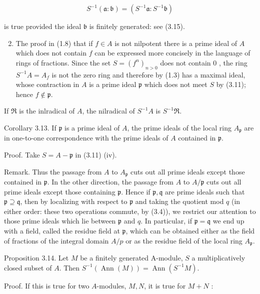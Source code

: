 \documentclass{standalone}
\theoremstyle{definition}
\theoremstyle{remark}
\begin{document}
\[
S^{-1}(\mathfrak{a}: \mathfrak{b})=\left(S^{-1} \mathfrak{a}: S^{-1} \mathfrak{b}\right)
\]

is true provided the ideal $\mathfrak{b}$ is finitely generated: see (3.15).

\begin{enumerate}
  \setcounter{enumi}{1}
  \item The proof in (1.8) that if $f \in A$ is not nilpotent there is a prime ideal of $A$ which does not contain $f$ can be expressed more concisely in the language of rings of fractions. Since the set $S=\left(f^{n}\right)_{n>0}$ does not contain 0 , the ring $S^{-1} A=A_{f}$ is not the zero ring and therefore by (1.3) has a maximal ideal, whose contraction in $A$ is a prime ideal $\mathfrak{p}$ which does not meet $S$ by (3.11); hence $f \notin \mathfrak{p}$.
\end{enumerate}
\begin{corollary}
If $\Re$ is the inlradical of $A$, the nilradical of $S^{-1}A$ is $S^{-1}\Re$.
\end{corollary}

Corollary 3.13. If $\mathfrak{p}$ is a prime ideal of $A$, the prime ideals of the local ring $A_{\mathfrak{p}}$ are in one-to-one correspondence with the prime ideals of $A$ contained in $\mathfrak{p}$.

Proof. Take $S=A-\mathfrak{p}$ in (3.11) (iv).

Remark. Thus the passage from $A$ to $A_{\mathfrak{p}}$ cuts out all prime ideals except those contained in $\mathfrak{p}$. In the other direction, the passage from $A$ to $A / \mathfrak{p}$ cuts out all prime ideals except those containing $\mathfrak{p}$. Hence if $\mathfrak{p}, \mathfrak{q}$ are prime ideals such that $\mathfrak{p} \supseteq \mathfrak{q}$, then by localizing with respect to $\mathfrak{p}$ and taking the quotient mod $q$ (in either order: these two operations commute, by (3.4)), we restrict our attention to those prime ideals which lie between $\mathfrak{p}$ and $q$. In particular, if $\mathfrak{p}=\mathfrak{q}$ we end up with a field, called the residue field at $\mathfrak{p}$, which can be obtained either as the field of fractions of the integral domain $A / p$ or as the residue field of the local ring $A_{\mathfrak{p}}$.

Proposition 3.14. Let $M$ be a finitely generated A-module, $S$ a multiplicatively closed subset of $A$. Then $S^{-1}(\operatorname{Ann}(M))=\operatorname{Ann}\left(S^{-1} M\right)$.

Proof. If this is true for two $A$-modules, $M, N$, it is true for $M+N$ :
\end{document}
